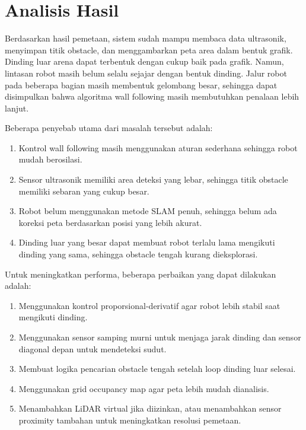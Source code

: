 \documentclass{article}
\begin{document}
\section{Analisis Hasil}

Berdasarkan hasil pemetaan, sistem sudah mampu membaca data ultrasonik, menyimpan titik obstacle, dan menggambarkan peta area dalam bentuk grafik. Dinding luar arena dapat terbentuk dengan cukup baik pada grafik. Namun, lintasan robot masih belum selalu sejajar dengan bentuk dinding. Jalur robot pada beberapa bagian masih membentuk gelombang besar, sehingga dapat disimpulkan bahwa algoritma wall following masih membutuhkan penalaan lebih lanjut.

Beberapa penyebab utama dari masalah tersebut adalah:

\begin{enumerate}[itemsep=0.2em]
    \item Kontrol wall following masih menggunakan aturan sederhana sehingga robot mudah berosilasi.
    \item Sensor ultrasonik memiliki area deteksi yang lebar, sehingga titik obstacle memiliki sebaran yang cukup besar.
    \item Robot belum menggunakan metode SLAM penuh, sehingga belum ada koreksi peta berdasarkan posisi yang lebih akurat.
    \item Dinding luar yang besar dapat membuat robot terlalu lama mengikuti dinding yang sama, sehingga obstacle tengah kurang dieksplorasi.
\end{enumerate}

Untuk meningkatkan performa, beberapa perbaikan yang dapat dilakukan adalah:

\begin{enumerate}[itemsep=0.2em]
    \item Menggunakan kontrol proporsional-derivatif agar robot lebih stabil saat mengikuti dinding.
    \item Menggunakan sensor samping murni untuk menjaga jarak dinding dan sensor diagonal depan untuk mendeteksi sudut.
    \item Membuat logika pencarian obstacle tengah setelah loop dinding luar selesai.
    \item Menggunakan grid occupancy map agar peta lebih mudah dianalisis.
    \item Menambahkan LiDAR virtual jika diizinkan, atau menambahkan sensor proximity tambahan untuk meningkatkan resolusi pemetaan.
\end{enumerate}
\end{document}
